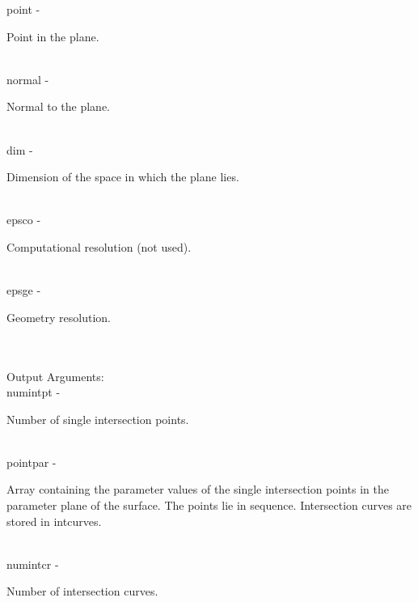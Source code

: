         \>\>    {\fov point}\> - \>     \begin{minipg2}
                                Point in the plane.
                                \end{minipg2}\\
        \>\>    {\fov normal}\> - \>    \begin{minipg2}
                                Normal to the plane.
                                \end{minipg2}\\
        \>\>    {\fov dim}\> - \>       \begin{minipg2}
                                Dimension of the space in which the plane lies.
                                \end{minipg2}\\
        \>\>    {\fov epsco}\> - \>     \begin{minipg2}
                                Computational resolution (not used).
                                \end{minipg2}\\
        \>\>    {\fov epsge}\> - \>     \begin{minipg2}
                                Geometry resolution.
                                \end{minipg2}\\
\\
        \>Output Arguments:\\
        \>\>    {\fov numintpt}\> - \>  \begin{minipg2}
                                Number of single intersection points.
                                \end{minipg2}\\
        \>\>    {\fov pointpar}\> - \>  \begin{minipg2}
                                Array containing the parameter values of the single
                                intersection points in the parameter plane of the
                                surface. The points lie in sequence. Intersection curves
                                are stored in intcurves.
                                \end{minipg2}\\[0.8ex]
        \>\>    numintcr\> - \> \begin{minipg2}
                                Number of intersection curves.
                                \end{minipg2}\\
